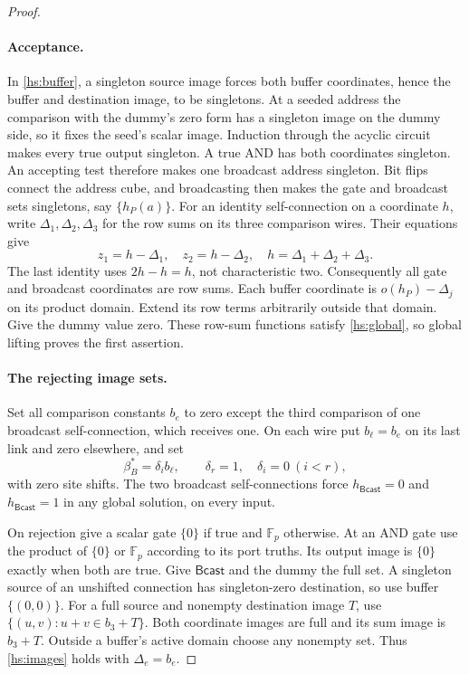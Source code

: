 \documentclass[11pt]{article}
\newcommand{\F}{\mathbb F_p}
\theoremstyle{definition}
\theoremstyle{remark}
\numberwithin{equation}{section}
\begin{document}
\begin{proof}
\paragraph{Acceptance.}
In \eqref{hs:buffer}, a singleton source image forces both buffer
coordinates, hence the buffer and destination image, to be singletons.
At a seeded address the comparison with the dummy's zero form has a
singleton image on the dummy side, so it fixes the seed's scalar image.  Induction through the acyclic circuit
makes every true output singleton. A true AND has both coordinates
singleton.  An accepting test therefore makes one broadcast address
singleton.  Bit flips connect the address cube, and broadcasting then
makes the gate and broadcast sets singletons, say \(\{h_P(a)\}\).
For an identity self-connection on a coordinate \(h\), write \(\Delta_1,\Delta_2,\Delta_3\) for the row sums on its three comparison wires. Their equations give
\[
 z_1=h-\Delta_1,\quad z_2=h-\Delta_2,\quad
 h=\Delta_1+\Delta_2+\Delta_3.
\]
The last identity uses \(2h-h=h\), not characteristic two.
Consequently all gate and broadcast coordinates are row sums.
Each buffer coordinate is \(o(h_P)-\Delta_j\) on its product domain.
Extend its row terms arbitrarily outside that domain.
Give the dummy value zero.  These row-sum functions satisfy
\eqref{hs:global}, so global lifting proves the first assertion.

\paragraph{The rejecting image sets.}
Set all comparison constants \(b_e\) to zero except the third
comparison of one broadcast self-connection, which receives one.
On each wire put \(b_\ell=b_e\) on its last link and zero elsewhere,
and set
\begin{equation}
 \beta^*_B=\delta_i b_\ell,\qquad
 \delta_r=1,\quad \delta_i=0\ (i<r),
 \label{hs:seam}
\end{equation}
with zero site shifts.  The two broadcast self-connections force
\(h_{\mathsf{Bcast}}=0\) and \(h_{\mathsf{Bcast}}=1\) in any global solution, on every input.

On rejection give a scalar gate \(\{0\}\) if true and \(\F\) otherwise.
At an AND gate use the product of \(\{0\}\) or \(\F\) according to
its port truths. Its output image is \(\{0\}\) exactly when both are
true.  Give \(\mathsf{Bcast}\) and the dummy the full set.
A singleton source of an unshifted connection has singleton-zero
destination, so use buffer \(\{(0,0)\}\).
For a full source and nonempty destination image \(T\), use
\(\{(u,v):u+v\in b_3+T\}\).
Both coordinate images are full and its sum image is \(b_3+T\).
Outside a buffer's active domain choose any nonempty set.
Thus \eqref{hs:images} holds with \(\Delta_e=b_e\).


\end{proof}
\end{document}
